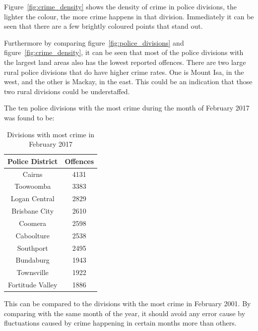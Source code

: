 \documentclass[]{article}
\begin{document}
Figure~\ref{fig:crime_density} shows the density of crime in police divisions, the lighter the colour, the more crime happens in that division.
Immediately it can be seen that there are a few brightly coloured points that stand out.

Furthermore by comparing figure~\ref{fig:police_divisions} and figure~\ref{fig:crime_density}, it can be seen that most of the police divisions with the largest land areas also has the lowest reported offences.
There are two large rural police divisions that do have higher crime rates. One is Mount Isa, in the west, and the other is Mackay, in the east. This could be an indication that those two rural divisions could be understaffed.

The ten police divisions with the most crime during the month of February 2017 was found to be:

\begin{table}[H]
    \caption{Divisions with most crime in February 2017}
    \centering
    \begin{tabular}{|c|c|}
        \hline
        Police District & Offences \\
        \hline
        Cairns & 4131 \\
        Toowoomba & 3383 \\
        Logan Central & 2829 \\
        Brisbane City & 2610 \\
        Coomera & 2598 \\
        Caboolture & 2538 \\
        Southport & 2495 \\
        Bundaburg & 1943 \\
        Townsville & 1922 \\
        Fortitude Valley & 1886 \\
        \hline
    \end{tabular}
\end{table}

This can be compared to the divisions with the most crime in February 2001. By comparing with the same month of the year, it should avoid any error cause by fluctuations caused by crime happening in certain months more than others.
\end{document}
